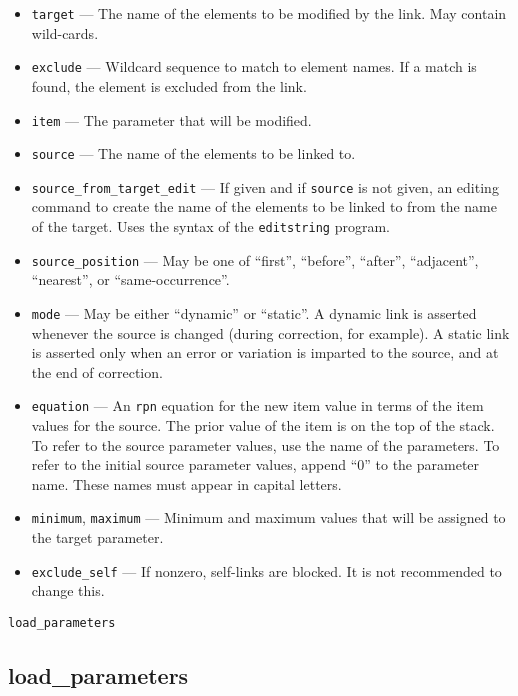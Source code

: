 \documentclass[11pt]{article}
\begin{document}
\begin{itemize}
\item \verb|target| --- The name of the elements to be modified by the link.  May contain
 wild-cards.
\item \verb|exclude| --- Wildcard sequence to match to element names.  If a match is found,
 the element is excluded from the link.
\item \verb|item| --- The parameter that will be modified.
\item \verb|source| --- The name of the elements to be linked to.
\item \verb|source_from_target_edit| --- If given and if \verb|source| is not given, 
  an editing command to create the name of the elements to be linked to from the name of the target.
  Uses the syntax of the {\tt editstring} program.
\item \verb|source_position| --- May be one of ``first'', ``before'', ``after'', 
``adjacent'', ``nearest'', or ``same-occurrence''.
\item \verb|mode| --- May be either ``dynamic'' or ``static''.  A dynamic link
is asserted whenever the source is changed (during correction, for example).  
A static link is asserted only when an error or variation is imparted to
the source, and at the end of correction.
\item \verb|equation| --- An {\tt rpn} equation for the new item value in
terms of the item values for the source.  The prior value of the item is 
on the top of the stack. To refer to the source
parameter values, use the name of the parameters. To refer to the initial source
parameter values, append ``0'' to the parameter name.  These names must appear
in capital letters.  
\item \verb|minimum|, \verb|maximum| --- Minimum and maximum values that will be
assigned to the target parameter.
\item \verb|exclude_self| --- If nonzero, self-links are blocked. It is not recommended to change this.
\end{itemize}

\newpage
\begin{center}{\Large\verb|load_parameters|}\end{center}
\subsection{load\_parameters \label{subsec:loadparameters}}
\end{document}
